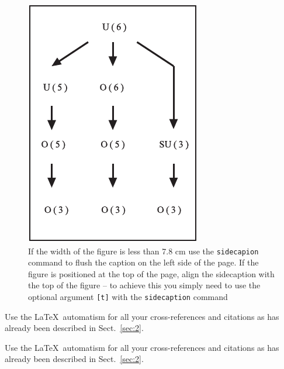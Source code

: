 \documentclass[graybox]{svmult}
\begin{document}
\begin{figure}[t]
\sidecaption[t]
\includegraphics[scale=.65]{figure}
%
%
\caption{If the width of the figure is less than 7.8 cm use the \texttt{sidecapion} command to flush the caption on the left side of the page. If the figure is positioned at the top of the page, align the sidecaption with the top of the figure -- to achieve this you simply need to use the optional argument \texttt{[t]} with the \texttt{sidecaption} command}
\label{fig:2}       %
\end{figure}

 Use the \LaTeX\ automatism for all your cross-references and citations as has already been described in Sect.~\ref{sec:2}.

 Use the \LaTeX\ automatism for all your cross-refer\-ences and citations as has already been described in Sect.~\ref{sec:2}.
\end{document}
